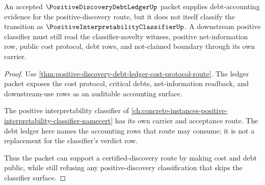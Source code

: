 \begin{theorem}
\label{thm:positive-discovery-debt-ledger-verdict-separation}
An accepted $\PositiveDiscoveryDebtLedgerUp$ packet supplies debt-accounting evidence for the positive-discovery route, but it does not itself classify the transition as $\PositiveInterpretabilityClassifierUp$. A downstream positive classifier must still read the classifier-novelty witness, positive net-information row, public cost protocol, debt rows, and not-claimed boundary through its own carrier.
\end{theorem}
\begin{proof}
Use \autoref{thm:positive-discovery-debt-ledger-cost-protocol-route}. The ledger packet exposes the cost protocol, critical debts, net-information readback, and downstream-use rows as an auditable accounting surface.

The positive interpretability classifier of \autoref{ch:concrete-instances-positive-interpretability-classifier-namecert} has its own carrier and acceptance route. The debt ledger here names the accounting rows that route may consume; it is not a replacement for the classifier's verdict row.

Thus the packet can support a certified-discovery route by making cost and debt public, while still refusing any positive-discovery classification that skips the classifier surface.
\end{proof}




